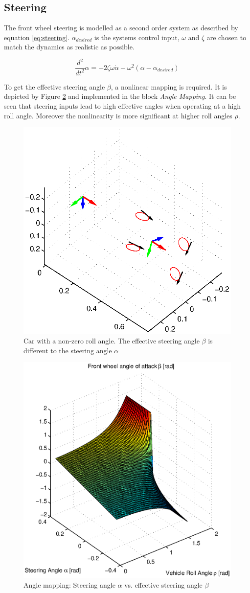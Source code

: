 \documentclass[conference]{IEEEtran}
\begin{document}
\subsection{Steering}

The front wheel steering is modelled as a second order system as described by equation \ref{eq:steering}. $\alpha _{desired}$ is the systems control input, $\omega$ and $\zeta$ are chosen to match the dynamics as realistic as possible.

\begin{equation}
\frac{{{d^2}}}{{d{t^2}}}\alpha  =  - 2\zeta \omega \dot \alpha  - {\omega ^2}\left( {\alpha  - {\alpha _{desired}}} \right)
\label{eq:steering}
\end{equation}

To get the effective steering angle $\beta$, a nonlinear mapping is required. It is depicted by Figure \ref{figure:angle_plot} and implemented in the block \textit{Angle Mapping}. It can be seen that steering inputs lead to high effective angles when operating at a high roll angle. Moreover the nonlinearity is more significant at higher roll angles $\rho$.

\begin{figure}[Hhh]
\centering
  \includegraphics[width=.3\textwidth]{pics/car_roll.eps} 
  \caption{Car with a non-zero roll angle. The effective steering angle $\beta$ is different to the steering angle $\alpha$}  
  \label{figure:car_roll}
\end{figure}

\begin{figure}[Hhh]
\centering
  \includegraphics[width=.4\textwidth]{pics/angle_plot.eps} 
  \caption{Angle mapping: Steering angle $\alpha$ vs. effective steering angle $\beta$}  
  \label{figure:angle_plot}
\end{figure}
\end{document}
